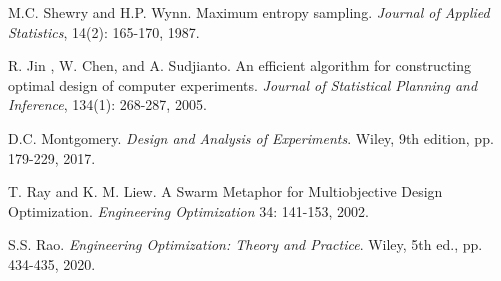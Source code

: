 \documentclass[twoside, 12pt,notitlepage]{report}
\begin{document}
\begin{enumerate}
M.C. Shewry and H.P. Wynn. Maximum entropy sampling. 
\textit{Journal of Applied Statistics}, 14(2): 165-170, 1987.


R. Jin , W. Chen, and A. Sudjianto. An efficient 
algorithm for constructing optimal design of computer 
experiments. \textit{Journal of Statistical Planning and 
Inference}, 134(1): 268-287, 2005.

D.C. Montgomery. \textit{Design and Analysis of Experiments}. 
Wiley, 9th edition, pp. 179-229, 2017.

T. Ray and K. M. Liew. A Swarm Metaphor for 
Multiobjective Design Optimization. \textit{Engineering 
Optimization} 34: 141-153, 2002.

S.S. Rao. \textit{Engineering Optimization: Theory and 
Practice}. Wiley, 5th ed., pp. 434-435, 2020.

\end{enumerate}
\end{document}
